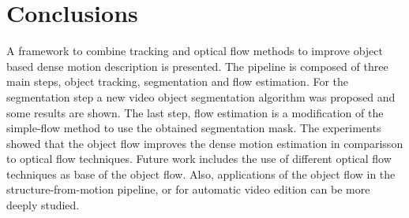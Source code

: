 \section{Conclusions}

A framework to combine tracking and optical flow methods to improve 
object based dense motion description is presented. The pipeline is 
composed of three main steps, object tracking, segmentation and 
flow estimation. For the segmentation step a new video object 
segmentation algorithm was proposed and some results are shown. 
The last step, flow estimation is a modification of the simple-flow method to use 
the obtained segmentation mask.
The experiments showed that the object flow improves the dense motion 
estimation in comparisson to optical flow techniques.
Future work includes the use of different optical flow techniques as base of the object flow. Also, 
applications of the object flow in the structure-from-motion pipeline, or for automatic video edition can be 
more deeply studied.



